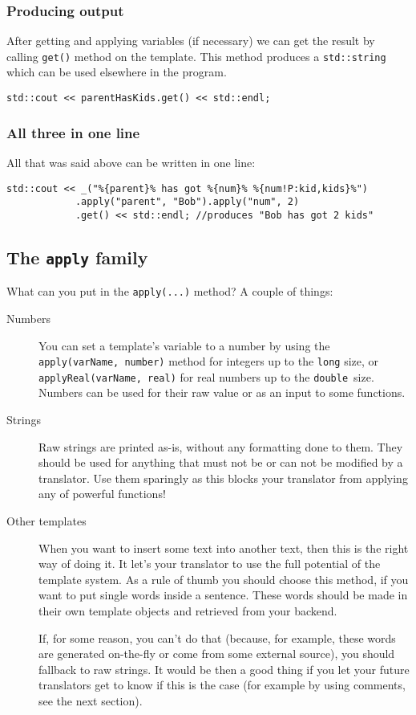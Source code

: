 \subsubsection{Producing output}
After getting and applying variables (if necessary) we can get the result by calling \verb+get()+ method on the template.
This method produces a \verb+std::string+ which can be used elsewhere in the program.
\begin{verbatim}
std::cout << parentHasKids.get() << std::endl;
\end{verbatim}

\subsubsection{All three in one line}
All that was said above can be written in one line:
\begin{verbatim}
std::cout << _("%{parent}% has got %{num}% %{num!P:kid,kids}%")
			.apply("parent", "Bob").apply("num", 2)
			.get() << std::endl; //produces "Bob has got 2 kids"
\end{verbatim}

\subsection{The \texttt{apply} family}
What can you put in the \verb+apply(...)+ method? A couple of things:
\begin{description}
  \item[Numbers] You can set a template's variable to a number by using the \verb+apply(varName, number)+ method for integers up to the \verb+long+ size,
  or \verb+applyReal(varName, real)+ for real numbers up to the \verb+double+~size. Numbers can be used for their raw value or as an input to some functions.
  \item[Strings] Raw strings are printed as-is, without any formatting done to them. They should be used for anything that must not be or can not be modified 
  by a translator. Use them sparingly as this blocks your translator from applying any of \mulan{} powerful functions!
  \item[Other templates] When you want to insert some text into another text, then this is the right way of doing it. 
  It let's your translator to use the full potential of the \mulan{} template system. As a rule of thumb you should choose this method, if you want
  to put single words inside a sentence. These words should be made in their own template objects and retrieved from your backend. 
  
  If, for some reason, you can't do that (because, for example, these words are generated on-the-fly or come from some external source), you should fallback to raw strings.
  It would be then a good thing if you let your future translators get to know if this is the case (for example by using \mulan{} comments, see the next section).
\end{description}

